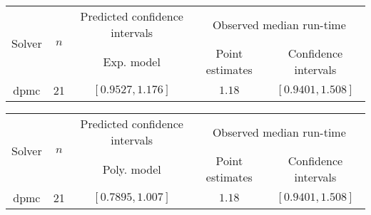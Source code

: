 \begin{tabular}{ccccc}
\hline 
\multirow{2}{*}{Solver} & \multirow{2}{*}{$n$} & Predicted confidence intervals & \multicolumn{2}{c}{Observed median  run-time}\tabularnewline
 &  & Exp. model  & Point estimates  & Confidence intervals\tabularnewline
\hline 
\hline 
\multirow{0}{*}{dpmc} & 21 & $\mathbf{\left[0.9527,1.176\right]}$ & $1.18$ & $\left[0.9401,1.508\right]$ \tabularnewline 
\hline 
\end{tabular} 

\begin{tabular}{ccccc}
\hline 
\multirow{2}{*}{Solver} & \multirow{2}{*}{$n$} & Predicted confidence intervals & \multicolumn{2}{c}{Observed median  run-time}\tabularnewline
 &  & Poly. model  & Point estimates  & Confidence intervals\tabularnewline
\hline 
\hline 
\multirow{0}{*}{dpmc} & 21 & $\mathbf{\left[0.7895,1.007\right]}$ & $1.18$ & $\left[0.9401,1.508\right]$ \tabularnewline 
\hline 
\end{tabular} 


